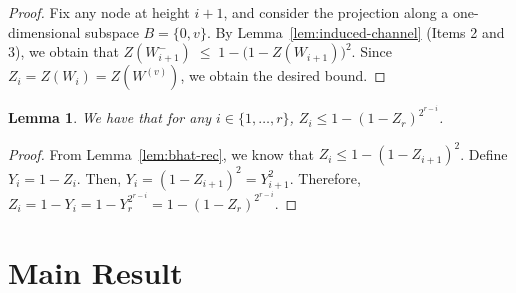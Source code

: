 \documentclass[conference,letterpaper]{IEEEtran}
\newtheorem{lemma}[theorem]{Lemma}
\begin{document}
\begin{proof}

Fix any node at height \( i+1 \), and consider the projection along a one-dimensional subspace \(B = \{0 ,v \} \).  By Lemma~\ref{lem:induced-channel} (Items 2 and 3), we obtain that 
$
Z(W_{i+1}^-)\;\le\;1-\bigl(1-Z(W_{i+1})\bigr)^2.
$
Since \(Z_i=Z(W_i)=Z(W^{(v)})\), we obtain the desired bound.
\end{proof}
\begin{lemma}\label{lem:bhat-unroll}
We have that for any $i\in \{1,\ldots,r\}$, $ Z_i  \leq 1- (1- Z_r)^{2^{r-i}}$.
\end{lemma}
\begin{proof}
    From Lemma~\ref{lem:bhat-rec}, we know that $ Z_i \leq 1-(1-Z_{i+1})^2 $.  Define $Y_i = 1 - Z_i$. Then, $ Y_i = (1-Z_{i+1})^2 = Y_{i+1}^2$. Therefore, $Z_i = 1-Y_i = 1-Y_r^{2^{r-i}} = 1-(1-Z_r)^{2^{r-i}}$.
\end{proof}

\section{Main Result}
\end{document}
